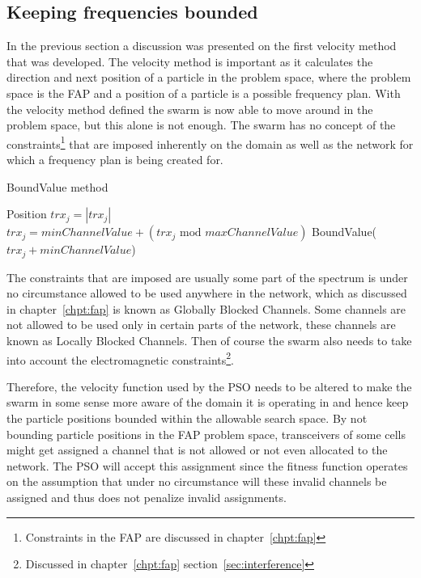 \subsection{Keeping frequencies bounded}
In the previous section a discussion was presented on the first velocity method that was developed. The velocity method is important as it calculates the direction and next position of a particle in the problem space, where the problem space is the FAP and a position of a particle is a possible frequency plan. With the velocity method defined the swarm is now able to move around in the problem space, but this alone is not enough. The swarm has no concept of the constraints\footnote{Constraints in the FAP are discussed in chapter~\ref{chpt:fap}} that are imposed inherently on the domain as well as the network for which a frequency plan is being created for.
\begin{algorithm}
\caption{BoundValue method}
\label{alg:boundvalue}
\begin{algorithmic}[1]
	\REQUIRE Position
			\STATE $trx_j = \left|trx_j\right|$
				\STATE $trx_j = minChannelValue + (\text{$trx_j$ mod $maxChannelValue$})$
			\ELSE 
					\STATE BoundValue($trx_j + minChannelValue$)
				\ENDIF
			\ENDIF
		\ENDFOR
	\ENDFOR
\end{algorithmic}
\end{algorithm}
The constraints that are imposed are usually some part of the spectrum is under no circumstance allowed to be used anywhere in the network, which as discussed in chapter~\ref{chpt:fap} is known as Globally Blocked Channels. Some channels are not allowed to be used only in certain parts of the network, these channels are known as Locally Blocked Channels. Then of course the swarm also needs to take into account the electromagnetic constraints\footnote{Discussed in chapter~\ref{chpt:fap} section~\ref{sec:interference}}.

Therefore, the velocity function used by the PSO needs to be altered to make the swarm in some sense more aware of the domain it is operating in and hence keep the particle positions bounded within the allowable search space. By not bounding particle positions in the FAP problem space, transceivers of some cells might get assigned a channel that is not allowed or not even allocated to the network. The PSO will accept this assignment since the fitness function operates on the assumption that under no circumstance will these invalid channels be assigned and thus does not penalize invalid assignments.

